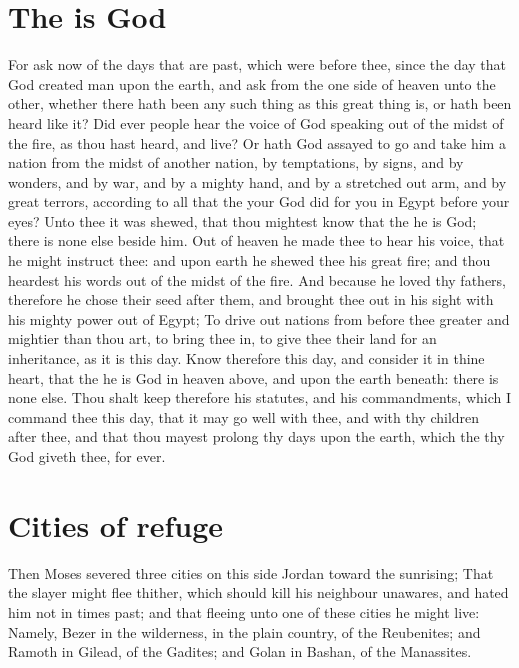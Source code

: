 \begin{biblechapter}
\section*{The \LORD is God}
\verse For ask now of the days that are past, which were before thee, since the day that God created man upon the earth, and ask from the one side of heaven unto the other, whether there hath been any such thing as this great thing is, or hath been heard like it?
\verse Did ever people hear the voice of God speaking out of the midst of the fire, as thou hast heard, and live?
\verse Or hath God assayed to go and take him a nation from the midst of another nation, by temptations, by signs, and by wonders, and by war, and by a mighty hand, and by a stretched out arm, and by great terrors, according to all that the \LORD your God did for you in Egypt before your eyes?
\verse Unto thee it was shewed, that thou mightest know that the \LORD he is God; there is none else beside him.
\verse Out of heaven he made thee to hear his voice, that he might instruct thee: and upon earth he shewed thee his great fire; and thou heardest his words out of the midst of the fire.
\verse And because he loved thy fathers, therefore he chose their seed after them, and brought thee out in his sight with his mighty power out of Egypt;
\verse To drive out nations from before thee greater and mightier than thou art, to bring thee in, to give thee their land for an inheritance, as it is this day.
\verse Know therefore this day, and consider it in thine heart, that the \LORD he is God in heaven above, and upon the earth beneath: there is none else.
\verse Thou shalt keep therefore his statutes, and his commandments, which I command thee this day, that it may go well with thee, and with thy children after thee, and that thou mayest prolong thy days upon the earth, which the \LORD thy God giveth thee, for ever.
\section*{Cities of refuge}
\verse Then Moses severed three cities on this side Jordan toward the sunrising;
\verse That the slayer might flee thither, which should kill his neighbour unawares, and hated him not in times past; and that fleeing unto one of these cities he might live:
\verse Namely, Bezer in the wilderness, in the plain country, of the Reubenites; and Ramoth in Gilead, of the Gadites; and Golan in Bashan, of the Manassites.

\end{biblechapter}
